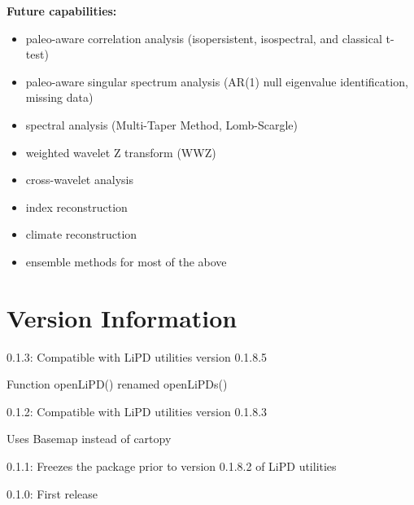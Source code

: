 \documentclass[letterpaper,10pt,english]{sphinxmanual}
\begin{document}
\textbf{Future capabilities:}
\begin{itemize}
\item {} 
paleo-aware correlation analysis (isopersistent, isospectral, and classical t-test)

\item {} 
paleo-aware singular spectrum analysis (AR(1) null eigenvalue identification, missing data)

\item {} 
spectral analysis (Multi-Taper Method, Lomb-Scargle)

\item {} 
weighted wavelet Z transform (WWZ)

\item {} 
cross-wavelet analysis

\item {} 
index reconstruction

\item {} 
climate reconstruction

\item {} 
ensemble methods for most of the above

\end{itemize}


\section{Version Information}
\label{Introduction:version-information}
\begin{DUlineblock}{0em}
\item[] 0.1.3: Compatible with LiPD utilities version 0.1.8.5
\item[]
\begin{DUlineblock}{\DUlineblockindent}
\item[] Function openLiPD() renamed openLiPDs()
\end{DUlineblock}
\item[] 0.1.2: Compatible with LiPD utilities version 0.1.8.3
\item[]
\begin{DUlineblock}{\DUlineblockindent}
\item[] Uses Basemap instead of cartopy
\end{DUlineblock}
\item[] 0.1.1: Freezes the package prior to version 0.1.8.2 of LiPD utilities
\item[] 0.1.0: First release
\end{DUlineblock}
\end{document}
